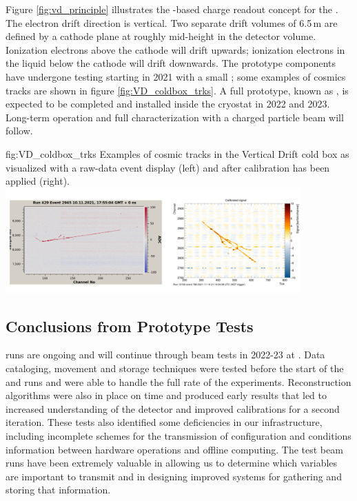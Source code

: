 \documentclass[../main-v1.tex]{subfiles}
\begin{document}
 Figure \ref{fig:vd_principle} illustrates the -based charge readout concept for the . The electron drift direction is vertical.
Two separate drift volumes of 6.5\,m are defined by a cathode plane at roughly mid-height in the
detector volume. Ionization electrons above the cathode will drift upwards; ionization electrons in the liquid below the cathode will drift downwards.
The   prototype components have undergone testing starting in 2021 with a small \coldbox; some examples of cosmics tracks are shown in figure \ref{fig:VD_coldbox_trks}. A full prototype, known as , is expected to be completed and  installed 
 inside the  cryostat in 2022 and 2023. Long-term operation and full characterization with a charged particle beam will follow. 

\begin{dunefigure}
{fig:VD_coldbox_trks}
{Examples of cosmic tracks in the Vertical Drift cold box as visualized with a raw-data event display (left) and after calibration has been applied (right).}
\includegraphics[width=0.85\textwidth]{graphics/IntroFigures/Fig_14_VD_coldbox.png}
\end{dunefigure}


\subsection{Conclusions from Prototype Tests }

runs are ongoing and will continue through beam tests in 2022-23 at .  Data cataloging, movement and storage techniques were tested before the start of the  and   runs and were able to handle the full rate of the experiments.   Reconstruction algorithms were also in place on time and %
produced early results that led to increased understanding of the detector and improved calibrations for a second iteration.  These tests also identified some deficiencies in our infrastructure, including incomplete schemes for the transmission of configuration and conditions information between hardware operations and  offline computing.  The test beam runs have been extremely valuable in allowing us to determine which variables are important to transmit and in designing improved systems for gathering and storing that information. 
\end{document}
